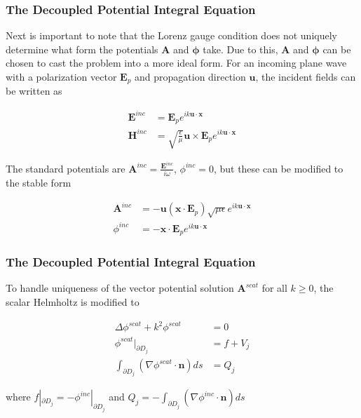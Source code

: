 \documentclass{beamer}
\newcommand{\bvec}[1]{\boldsymbol{#1}}
\begin{document}
	\begin{frame}
	\frametitle{The Decoupled Potential Integral Equation}
	Next is important to note that the Lorenz gauge condition does not uniquely determine what form the potentials $\bvec{A}$ and $\bvec{\phi}$ take. Due to this, $\bvec{A}$ and $\bvec{\phi}$ can be chosen to cast the problem into a more ideal form. For an incoming plane wave with a polarization vector $\bvec{E}_p$ and propagation direction $\bvec{u}$, the incident fields can be written as
	
	\begin{align*}
	\bvec{E}^{inc} &= \bvec{E}_p e^{i k \bvec{u} \cdot \bvec{x}} \\
	\bvec{H}^{inc} &= \sqrt{\frac{\epsilon}{\mu}} \bvec{u} \times \bvec{E}_p e^{i k \bvec{u} \cdot \bvec{x}}
	\end{align*}
	
	The standard potentials are $\bvec{A}^{inc} = \frac{\bvec{E}^{inc}}{i \omega}$, $\phi^{inc} = 0$, but these can be modified to the stable form
	
	\begin{align*}
	\bvec{A}^{inc} &= - \bvec{u} \left( \bvec{x} \cdot \bvec{E}_p\right) \sqrt{\mu \epsilon} e^{i k \bvec{u} \cdot \bvec{x}} \\
	\phi^{inc} &= - \bvec{x} \cdot \bvec{E}_p e^{i k \bvec{u} \cdot \bvec{x} }
	\end{align*}
	
	\end{frame}

	\begin{frame}
	\frametitle{The Decoupled Potential Integral Equation}
	To  handle uniqueness of the vector potential solution $\bvec{A}^{scat}$ for all $k \geq 0$, the scalar Helmholtz is modified to
	
	\begin{align*}
	\Delta \phi^{scat} + k^2 \phi^{scat} &= 0 \\
	\phi^{scat}|_{\partial D_j} &= f + V_j \\
	\int_{\partial D_j} \left( \nabla \phi^{scat} \cdot \bvec{n}\right) ds &= Q_j
	\end{align*}
	
	where $f|_{\partial D_j} = - \phi^{inc}|_{\partial D_j}$ and $Q_j = - \int_{\partial D_j} \left( \nabla \phi^{inc} \cdot \bvec{n}\right) ds$
	
	\end{frame}
\end{document}
